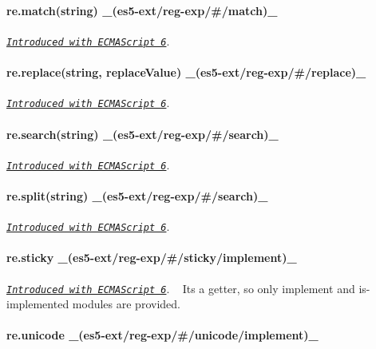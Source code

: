 \paragraph*{re.\+match(string) \+\_\+(es5-\/ext/reg-\/exp/\#/match)\+\_\+}

\href{http://people.mozilla.org/~jorendorff/es6-draft.html#sec-regexp.prototype.match}{\tt {\itshape Introduced with E\+C\+M\+A\+Script 6}}. ~\newline
 \paragraph*{re.\+replace(string, replace\+Value) \+\_\+(es5-\/ext/reg-\/exp/\#/replace)\+\_\+}

\href{http://people.mozilla.org/~jorendorff/es6-draft.html#sec-regexp.prototype.replace}{\tt {\itshape Introduced with E\+C\+M\+A\+Script 6}}. ~\newline
 \paragraph*{re.\+search(string) \+\_\+(es5-\/ext/reg-\/exp/\#/search)\+\_\+}

\href{http://people.mozilla.org/~jorendorff/es6-draft.html#sec-regexp.prototype.search}{\tt {\itshape Introduced with E\+C\+M\+A\+Script 6}}. ~\newline
 \paragraph*{re.\+split(string) \+\_\+(es5-\/ext/reg-\/exp/\#/search)\+\_\+}

\href{http://people.mozilla.org/~jorendorff/es6-draft.html#sec-regexp.prototype.split}{\tt {\itshape Introduced with E\+C\+M\+A\+Script 6}}. ~\newline
 \paragraph*{re.\+sticky \+\_\+(es5-\/ext/reg-\/exp/\#/sticky/implement)\+\_\+}

\href{http://people.mozilla.org/~jorendorff/es6-draft.html#sec-regexp.prototype.sticky}{\tt {\itshape Introduced with E\+C\+M\+A\+Script 6}}. ~\newline
It\textquotesingle{}s a getter, so only {\ttfamily implement} and {\ttfamily is-\/implemented} modules are provided.

\paragraph*{re.\+unicode \+\_\+(es5-\/ext/reg-\/exp/\#/unicode/implement)\+\_\+}


